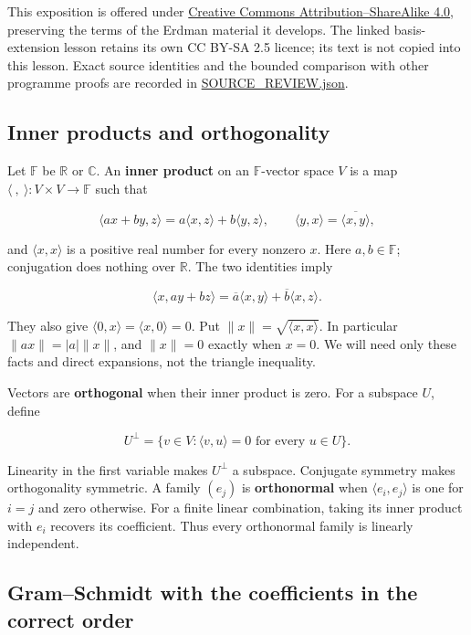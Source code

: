 \documentclass[
  english,
]{article}
\begin{document}
This exposition is offered under
\href{https://creativecommons.org/licenses/by-sa/4.0/}{Creative Commons
Attribution--ShareAlike 4.0}, preserving the terms of the Erdman
material it develops. The linked basis-extension lesson retains its own
CC BY-SA 2.5 licence; its text is not copied into this lesson. Exact
source identities and the bounded comparison with other programme proofs
are recorded in \url{SOURCE_REVIEW.json}.

\subsection{Inner products and
orthogonality}\label{inner-products-and-orthogonality}

Let \(\mathbb F\) be \(\mathbb R\) or \(\mathbb C\). An \textbf{inner
product} on an \(\mathbb F\)-vector space \(V\) is a map
\(\langle\ ,\ \rangle:V\times V\to\mathbb F\) such that

\[
\langle ax+by,z\rangle=a\langle x,z\rangle+b\langle y,z\rangle,
\qquad \langle y,x\rangle=\overline{\langle x,y\rangle},
\]

and \(\langle x,x\rangle\) is a positive real number for every nonzero
\(x\). Here \(a,b\in\mathbb F\); conjugation does nothing over
\(\mathbb R\). The two identities imply

\[
\langle x,ay+bz\rangle=\overline a\langle x,y\rangle+\overline b\langle x,z\rangle.
\]

They also give \(\langle0,x\rangle=\langle x,0\rangle=0\). Put
\(\|x\|=\sqrt{\langle x,x\rangle}\). In particular \(\|ax\|=|a|\|x\|\),
and \(\|x\|=0\) exactly when \(x=0\). We will need only these facts and
direct expansions, not the triangle inequality.

Vectors are \textbf{orthogonal} when their inner product is zero. For a
subspace \(U\), define

\[
U^\perp=\{v\in V:\langle v,u\rangle=0\text{ for every }u\in U\}.
\]

Linearity in the first variable makes \(U^\perp\) a subspace. Conjugate
symmetry makes orthogonality symmetric. A family \((e_j)\) is
\textbf{orthonormal} when \(\langle e_i,e_j\rangle\) is one for \(i=j\)
and zero otherwise. For a finite linear combination, taking its inner
product with \(e_i\) recovers its coefficient. Thus every orthonormal
family is linearly independent.

\subsection{Gram--Schmidt with the coefficients in the correct
order}\label{gramschmidt-with-the-coefficients-in-the-correct-order}
\end{document}
